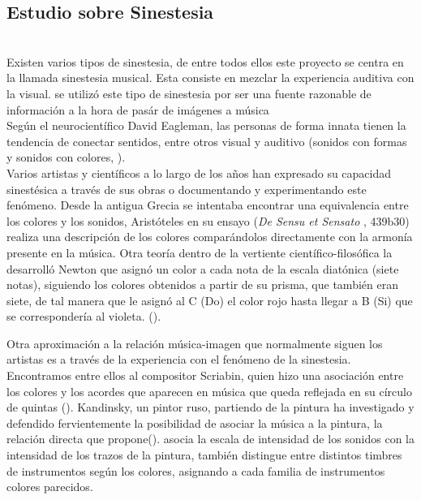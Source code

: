 \subsection{Estudio sobre Sinestesia}
\label{subsubsec:estudioSinestesia}

\\

Existen varios tipos de sinestesia, de entre todos ellos este proyecto se centra en la llamada sinestesia musical. Esta consiste en mezclar la experiencia auditiva con la visual. \color{blue}se utilizó este tipo de sinestesia por ser una fuente razonable de información a la hora de pasár de imágenes a música \color{black}
\\Según el neurocientífico David Eagleman, las personas de forma innata tienen la tendencia de conectar sentidos, entre otros visual y auditivo (sonidos con formas y sonidos con colores, \cite{VideoRedesFliparColores}).\\

Varios artistas y científicos a lo largo de los años han expresado su capacidad sinestésica a través de sus obras o documentando y experimentando este fenómeno. Desde la antigua Grecia se intentaba encontrar una equivalencia entre los colores y los sonidos, Aristóteles en su ensayo (\emph{De Sensu et Sensato} \cite{DeSensuEtSensato}, 439b30) realiza una descripción de los colores comparándolos directamente con la armonía presente en la música. \color{blue}Otra teoría dentro de la vertiente científico-filosófica la desarrolló Newton que asignó un color a cada nota de la escala diatónica (siete notas), siguiendo los colores obtenidos a partir de su prisma, que también eran siete, de tal manera que le asignó al C (Do) el color rojo hasta llegar a B (Si) que se correspondería al violeta. (\cite{OpticksNewton}).\\ \color{black}

Otra aproximación a la relación música-imagen que normalmente siguen los artistas es a través de la experiencia con el fenómeno de la sinestesia. Encontramos entre ellos al compositor Scriabin, quien hizo una asociación entre los colores y los acordes que aparecen en música que queda reflejada en su círculo de quintas (\cite{ScriabinQuintasColor}). Kandinsky, un pintor ruso, partiendo de la pintura ha investigado y defendido fervientemente la posibilidad de asociar la música a la pintura, la relación directa que propone(\cite{ConcerningSpiritualArt}). \color{blue} asocia la escala de intensidad de los sonidos con la intensidad de los trazos de la pintura, también distingue entre distintos timbres de instrumentos según los colores, asignando a cada familia de instrumentos colores parecidos.\\ \color{black}

